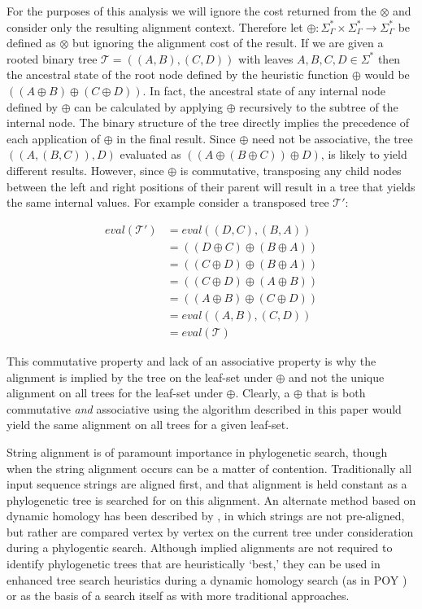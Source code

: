\documentclass{bmcart}
\begin{document}
For the purposes of this analysis we will ignore the cost returned from the $\otimes$ and consider only the resulting alignment context.
Therefore let $\oplus : \Sigma^{*}_{\Gamma} \times \Sigma^{*}_{\Gamma} \rightarrow \Sigma^{*}_{\Gamma}$ be defined as $\otimes$ but ignoring the alignment cost of the result. If we are given a rooted binary tree $\mathcal{T} = ((A,B),(C,D))$ with leaves $A, B, C, D \in \Sigma^{*}$ then the ancestral state of the root node defined by the heuristic function $\oplus$ would be $((A \oplus B) \oplus (C \oplus D))$. 
In fact, the ancestral state of any internal node defined by $\oplus$ can be calculated by applying $\oplus$ recursively to the subtree of the internal node.
The binary structure of the tree directly implies the precedence of each application of $\oplus$ in the final result.
Since $\oplus$ need not be associative, the tree $((A,(B,C)),D)$ evaluated as $((A \oplus (B \oplus C)) \oplus D)$, is likely to yield different results.
However, since $\oplus$ is commutative, transposing any child nodes between the left and right positions of their parent will result in a tree that yields the same internal values. 
For example consider a transposed tree $\mathcal{T'}$:

\begin{align*}
  eval(\mathcal{T'}) &= eval((D,C),(B,A))
\\  &= ((D \oplus C) \oplus (B \oplus A))
\\  &= ((C \oplus D) \oplus (B \oplus A))
\\  &= ((C \oplus D) \oplus (A \oplus B))
\\  &= ((A \oplus B) \oplus (C \oplus D))
\\  &= eval((A,B),(C,D))
\\  &= eval(\mathcal{T})
\end{align*}

This commutative property and lack of an associative property is why the alignment is implied by the tree on the leaf-set under $\oplus$ and not the unique alignment on all trees for the leaf-set under $\oplus$.
Clearly, a $\oplus$ that is both commutative \emph{and} associative using the algorithm described in this paper would yield the same alignment on all trees for a given leaf-set.

String alignment is of paramount importance in phylogenetic search, though when the string alignment occurs can be a matter of contention.
Traditionally all input sequence strings are aligned first, and that alignment is held constant as a phylogenetic tree is searched for on this alignment.
An alternate method based on dynamic homology has been described by \citep{Wheeler1996}, in which strings are not pre-aligned, but rather are compared vertex by vertex on the current tree under consideration during a phylogentic search.
Although implied alignments are not required to identify phylogenetic trees that are heuristically `best,' they can be used in enhanced tree search heuristics during a dynamic homology search (as in POY \citealp{POY5, Wheeleretal2015}) or as the basis of a search itself as with more traditional approaches.
\end{document}

